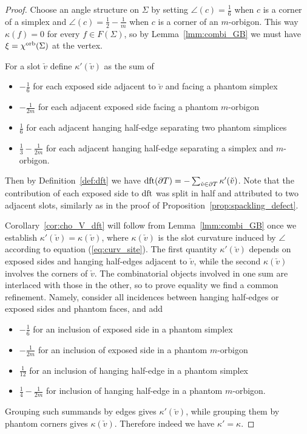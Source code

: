\documentclass{amsart}
\newcommand{\cho}{\chi^{\textnormal{orb}}}
\newcommand{\dft}{\textnormal{dft}}
\begin{document}
\begin{proof}
Choose an angle structure on $\Sigma$ by setting $\angle(c)=\tfrac{1}{6}$ when $c$ is a corner of a simplex and $\angle(c)=\tfrac{1}{2}-\tfrac{1}{m}$ when $c$ is a corner of an $m$-orbigon. This way $\kappa(f)=0$ for every $f\in F(\Sigma)$, so by Lemma~\ref{lmm:combi_GB} we must have $\xi=\cho(\Sigma)$ at the vertex.

For a slot $\check{v}$ define $\kappa'(\check{v})$ as the sum of
\begin{itemize}
\item $-\tfrac{1}{6}$ for each exposed side adjacent to $\check{v}$ and facing a phantom simplex
\item $-\tfrac{1}{2m}$ for each adjacent exposed side facing a phantom $m$-orbigon
\item $\tfrac{1}{6}$ for each adjacent hanging half-edge separating two phantom simplices
\item $\tfrac{1}{3}-\tfrac{1}{2m}$ for each adjacent hanging half-edge separating a simplex and $m$-orbigon.
\end{itemize}
Then by Definition~\ref{def:dft} we have $\dft(\partial T)=-\sum_{\check{v}\in\partial T}\kappa'(\check{v})$. Note that the contribution of each exposed side to $\dft$ was split in half and attributed to two adjacent slots, similarly as in the proof of Proposition~\ref{prop:spackling_defect}.

Corollary~\ref{cor:cho_V_dft} will follow from Lemma~\ref{lmm:combi_GB} once we establish $\kappa'(\check{v})=\kappa(\check{v})$, where $\kappa(\check{v})$ is the slot curvature induced by $\angle$ according to equation (\ref{eq:curv_site}). The first quantity $\kappa'(\check{v})$ depends on exposed sides and hanging half-edges adjacent to $\check{v}$, while the second $\kappa(\check{v})$ involves the corners of $\check{v}$. The combinatorial objects involved in one sum are interlaced with those in the other, so to prove equality we find a common refinement. Namely, consider all incidences between hanging half-edges or exposed sides and phantom faces, and add
\begin{itemize}
\item $-\tfrac{1}{6}$ for an inclusion of exposed side in a phantom simplex
\item $-\tfrac{1}{2m}$ for an inclusion of exposed side in a phantom $m$-orbigon
\item $\tfrac{1}{12}$ for an inclusion of hanging half-edge in a phantom simplex
\item $\tfrac{1}{4}-\tfrac{1}{2m}$ for inclusion of hanging half-edge in a phantom $m$-orbigon.
\end{itemize}
Grouping such summands by edges gives $\kappa'(\check{v})$, while grouping them by phantom corners gives $\kappa(\check{v})$. Therefore indeed we have $\kappa'=\kappa$.
\end{proof}
\end{document}
